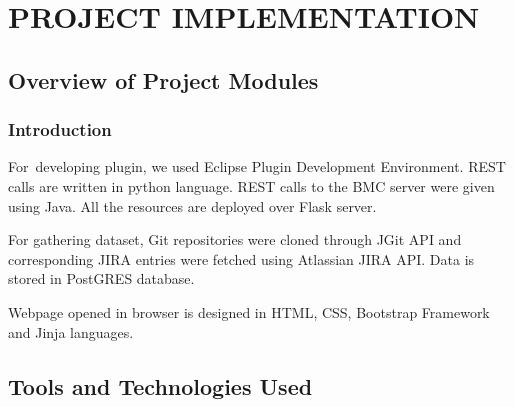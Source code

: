 \documentclass[oneside,a4paper,12pt]{book}
\begin{document}
\vspace{\baselineskip}
\setlength{\parskip}{9.96pt}

\vspace{\baselineskip}
\pagebreak\par

\chapter{PROJECT IMPLEMENTATION}


\vspace{\baselineskip}



 
\section{Overview of Project Modules}

\subsection{Introduction}


\begin{justify}
\tab For\ developing plugin, we used Eclipse Plugin Development Environment. REST calls are written in python language. REST calls  to the BMC server were given using Java. All the resources are deployed over Flask server. 
\end{justify}\par

\begin{justify}
\tab For gathering dataset, Git repositories were cloned through JGit API and corresponding JIRA entries were fetched using Atlassian JIRA API. Data is stored in PostGRES database. 
\end{justify}\par

\begin{justify}
\tab Webpage opened in browser is designed in HTML, CSS, Bootstrap Framework and Jinja languages.
\end{justify}\par


\section{Tools and Technologies Used}
\end{document}

